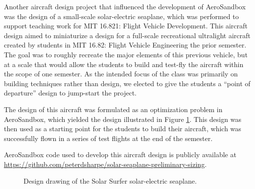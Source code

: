 Another aircraft design project that influenced the development of AeroSandbox was the design of a small-scale solar-electric seaplane, which was performed to support teaching work for MIT 16.821: Flight Vehicle Development. This aircraft design aimed to miniaturize a design for a full-scale recreational ultralight aircraft created by students in MIT 16.82: Flight Vehicle Engineering the prior semester. The goal was to roughly recreate the major elements of this previous vehicle, but at a scale that would allow the students to build and test-fly the aircraft within the scope of one semester. As the intended focus of the class was primarily on building techniques rather than design, we elected to give the students a ``point of departure'' design to jump-start the project.

The design of this aircraft was formulated as an optimization problem in AeroSandbox, which yielded the design illustrated in Figure \ref{fig:solar_surfer_design}. This design was then used as a starting point for the students to build their aircraft, which was successfully flown in a series of test flights at the end of the semester.

AeroSandbox code used to develop this aircraft design is publicly available at \url{https://github.com/peterdsharpe/solar-seaplane-preliminary-sizing}.

\newpage
\begin{figure}[H]
    \centering
    \caption{Design drawing of the Solar Surfer solar-electric seaplane.}
    \label{fig:solar_surfer_design}
\end{figure}

